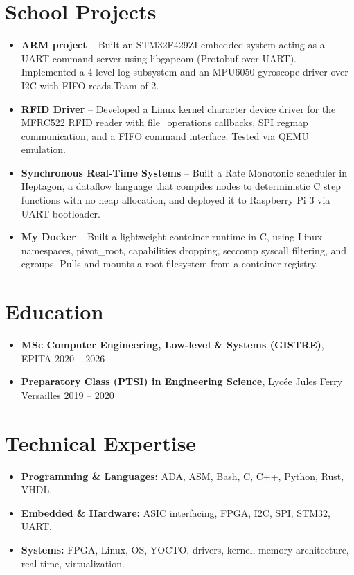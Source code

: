 \documentclass[9pt,a4paper]{article}
\begin{document}
\section*{School Projects}
\begin{tcolorbox}[mybox]
\begin{itemize}
\item \textbf{ARM project} -- Built an STM32F429ZI embedded system acting as a UART command server using libgapcom (Protobuf over UART). Implemented a 4-level log subsystem and an MPU6050 gyroscope driver over I2C with FIFO reads.Team of 2.

\item \textbf{RFID Driver} -- Developed a Linux kernel character device driver for the MFRC522 RFID reader with file\_operations callbacks, SPI regmap communication, and a FIFO command interface. Tested via QEMU emulation.

\item \textbf{Synchronous Real-Time Systems} -- Built a Rate Monotonic scheduler in Heptagon, a dataflow language that compiles nodes to deterministic C step functions with no heap allocation, and deployed it to Raspberry Pi 3 via UART bootloader.

\item \textbf{My Docker} -- Built a lightweight container runtime in C, using Linux namespaces, pivot\_root, capabilities dropping, seccomp syscall filtering, and cgroups. Pulls and mounts a root filesystem from a container registry.
\end{itemize}
\end{tcolorbox}


\section*{Education}
\begin{tcolorbox}[mybox]
\begin{itemize}
\item \textbf{MSc Computer Engineering, Low-level \& Systems (GISTRE)}, EPITA {\small{\hfill 2020 – 2026}}

\item \textbf{Preparatory Class (PTSI) in Engineering Science}, Lycée Jules Ferry Versailles {\small{\hfill 2019 – 2020}}
\end{itemize}
\end{tcolorbox}


\section*{Technical Expertise}
\begin{tcolorbox}[mybox]
\begin{itemize}
\item \textbf{Programming \& Languages:} ADA, ASM, Bash, C, C++, Python, Rust, VHDL.

\item \textbf{Embedded \& Hardware:} ASIC interfacing, FPGA, I2C, SPI, STM32, UART.

\item \textbf{Systems:} FPGA, Linux, OS, YOCTO, drivers, kernel, memory architecture, real-time, virtualization.
\end{itemize}
\end{tcolorbox}
\end{document}
